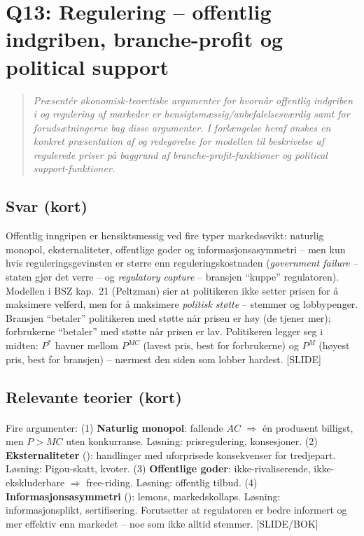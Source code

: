 \section{Q13: Regulering -- offentlig indgriben, branche-profit og political support}\label{q:13}

\begin{quote}
\emph{Præsentér økonomisk-teoretiske argumenter for hvornår offentlig indgriben i og regulering af markeder er hensigtsmæssig/anbefalelsesværdig samt for forudsætningerne bag disse argumenter. I forlængelse heraf ønskes en konkret præsentation af og redegørelse for modellen til beskrivelse af regulerede priser på baggrund af branche-profit-funktioner og political support-funktioner.}
\end{quote}

\subsection*{Svar (kort)}
Offentlig inngripen er hensiktsmessig ved fire typer markedssvikt: naturlig monopol, eksternaliteter, offentlige goder og informasjonsasymmetri -- men kun hvis reguleringsgevinsten er større enn reguleringskostnaden (\emph{government failure} -- staten gjør det verre -- og \emph{regulatory capture} -- bransjen ``kuppe'' regulatoren). Modellen i BSZ kap.\ 21 (Peltzman) sier at politikeren ikke setter prisen for å maksimere velferd, men for å maksimere \emph{politisk støtte} -- stemmer og lobbypenger. Bransjen ``betaler'' politikeren med støtte når prisen er høy (de tjener mer); forbrukerne ``betaler'' med støtte når prisen er lav. Politikeren legger seg i midten: $P^*$ havner mellom $P^{MC}$ (lavest pris, best for forbrukerne) og $P^M$ (høyest pris, best for bransjen) -- nærmest den siden som lobber hardest. [SLIDE]

\subsection*{Relevante teorier (kort)}

\paragraph{\quad\SOne}
Fire argumenter: (1) \textbf{Naturlig monopol}: fallende $AC$ $\Rightarrow$ én produsent billigst, men $P>MC$ uten konkurranse. Løsning: prisregulering, konsesjoner. (2) \textbf{Eksternaliteter} (): handlinger med uforprisede konsekvenser for tredjepart. Løsning: Pigou-skatt, kvoter. (3) \textbf{Offentlige goder}: ikke-rivaliserende, ikke-ekskluderbare $\Rightarrow$ free-riding. Løsning: offentlig tilbud. (4) \textbf{Informasjonsasymmetri} (): lemons, markedskollaps. Løsning: informasjonsplikt, sertifisering. Forutsetter at regulatoren er bedre informert og mer effektiv enn markedet -- noe som ikke alltid stemmer. [SLIDE/BOK]

